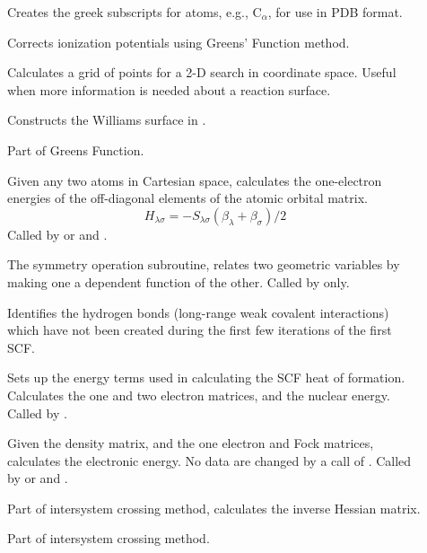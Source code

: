 \begin{description}
\item[] Creates the greek subscripts for atoms, e.g., C$_{\alpha}$,
for use in PDB format.

\item[] Corrects ionization potentials using Greens' Function
method.

\item[] Calculates a grid of points for a 2-D search in coordinate
space.  Useful when more information is needed about a reaction surface.

\item[] Constructs the Williams surface in .

\item[] Part of Greens Function.

\item[] Given any two atoms in Cartesian space,
  calculates the one-electron energies of the off-diagonal 
elements of the atomic orbital matrix.  $$ H_{\lambda\sigma} =
-S_{\lambda\sigma}(\beta_{\lambda}+\beta_{\sigma})/2 $$ Called by 
or  and .

\item[] The symmetry operation subroutine,  relates
two geometric variables by making one a dependent function of the  other.
Called by  only.

\item[] Identifies the hydrogen bonds (long-range weak covalent
interactions) which have not been created during the first few iterations of
the first SCF.

\item[] Sets up the energy terms used in calculating
the SCF heat of formation. Calculates the one and two electron matrices, and
the nuclear energy. Called by .

\item[] Given the density matrix, and the one electron and
Fock matrices, calculates the electronic energy. No data are  changed by a call
of . Called by  or   and .

\item[] Part of intersystem crossing method, calculates the
inverse Hessian matrix.

\item[] Part of intersystem crossing method.


\end{description}
